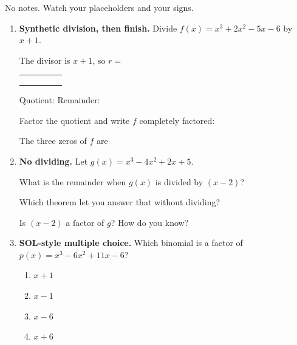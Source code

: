 \documentclass[10pt]{article}
\begin{document}
\namedateperiod

\vspace{0.10in}

No notes. Watch your placeholders and your signs.

\begin{enumerate}[leftmargin=1.8em, itemsep=12pt]
  \item \textbf{Synthetic division, then finish.} Divide $f(x) = x^3 + 2x^2 - 5x - 6$ by $x + 1$.

    \vspace{3pt}
    The divisor is $x+1$, so $r = $ \blank{1.0cm}
    \begin{center}
    \renewcommand{\arraystretch}{1.6}
    \begin{tabular}{r|C{1.5cm}C{1.5cm}C{1.5cm}C{1.5cm}}
        &     &     &     &     \\
        &     &     &     &     \\ 
        &     &     &     &     \\
    \end{tabular}
    \end{center}

    \vspace{2pt}
    Quotient: \blank{3.0cm} \quad Remainder: \blank{1.2cm}

    \vspace{3pt}
    Factor the quotient and write $f$ completely factored: \blank{5.0cm}

    \vspace{3pt}
    The three zeros of $f$ are \blank{4.0cm}

  \item \textbf{No dividing.} Let $g(x) = x^3 - 4x^2 + 2x + 5$.

    \vspace{3pt}
    What is the remainder when $g(x)$ is divided by $(x - 2)$? \blank{1.6cm}

    \vspace{3pt}
    Which theorem let you answer that without dividing? \blank{4.0cm}

    \vspace{3pt}
    Is $(x-2)$ a factor of $g$? \blank{1.2cm} \; How do you know? \blank{5.0cm}

  \item \textbf{SOL-style multiple choice.} Which binomial is a factor of
    $p(x) = x^3 - 6x^2 + 11x - 6$?
    \begin{enumerate}[label=\Alph*., leftmargin=1.9em, itemsep=1pt]
      \item $x + 1$
      \item $x - 1$
      \item $x - 6$
      \item $x + 6$
    \end{enumerate}
\end{enumerate}
\end{document}
